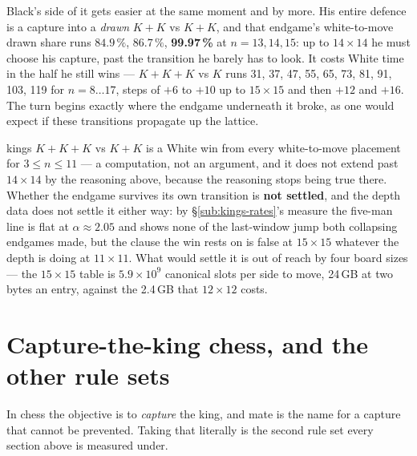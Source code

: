 \documentclass[10pt]{article}
\begin{document}
Black's side of it gets easier at the same moment and by more. His entire
defence is a capture into a \emph{drawn} $K\!+\!K$ vs $K\!+\!K$, and that
endgame's white-to-move drawn share runs $84.9\,\%$, $86.7\,\%$,
\textbf{99.97\,\%} at $n=13,14,15$: up to $14\times14$ he must choose his
capture, past the transition he barely has to look. It costs White time in the
half he still wins --- $K\!+\!K\!+\!K$ vs $K$ runs 31, 37, 47, 55, 65, 73, 81,
91, 103, 119 for $n=8\ldots17$, steps of $+6$ to $+10$ up to $15\times15$ and
then $+12$ and $+16$. The turn begins exactly where the endgame underneath it
broke, as one would expect if these transitions propagate up the lattice.

\begin{result}[title={What is settled here, and what is not}]{kings}
$K\!+\!K\!+\!K$ vs $K\!+\!K$ is a White win from every white-to-move placement
for $3\le n\le11$ --- a computation, not an argument, and it does not extend
past $14\times14$ by the reasoning above, because the reasoning stops being
true there. Whether the endgame survives its own transition is \textbf{not
settled}, and the depth data does not settle it either way: by
\S\ref{sub:kings-rates}'s measure the five-man line is flat at
$\alpha\approx2.05$ and shows none of the last-window jump both collapsing
endgames made, but the clause the win rests on is false at $15\times15$
whatever the depth is doing at $11\times11$. What would settle it is out of
reach by four board sizes --- the $15\times15$ table is $5.9\times10^{9}$
canonical slots per side to move, 24\,GB at two bytes an entry, against the
2.4\,GB that $12\times12$ costs.
\end{result}

\section{Capture-the-king chess, and the other rule sets}\label{sec:rules}

\noindent
In chess the objective is to \emph{capture} the king, and mate is the name for
a capture that cannot be prevented. Taking that literally is the second rule
set every section above is measured under.
\end{document}
